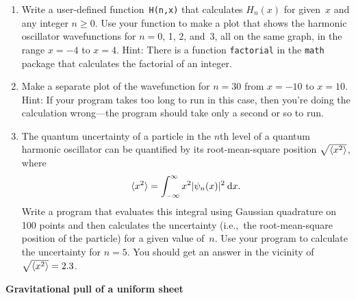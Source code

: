 \documentclass[12pt]{article}
\begin{document}
\begin{exercises}
\begin{enumerate}\setlength{\itemsep}{0pt}
\item Write a user-defined function~\verb|H(n,x)| that calculates $H_n(x)$
  for given~$x$ and any integer $n\ge0$.  Use your function to make a plot
  that shows the harmonic oscillator wavefunctions for $n=0$, 1, 2, and~3,
  all on the same graph, in the range $x=-4$ to $x=4$.  Hint: There is a
  function \verb|factorial| in the \verb|math| package that
  calculates the factorial of an integer.
\item Make a separate plot of the wavefunction for $n=30$ from $x=-10$ to
  $x=10$.  Hint: If your program takes too long to run in this case, then
  you're doing the calculation wrong---the program should take only a
  second or so to run.
\item The quantum uncertainty of a particle in the $n$th level of a quantum
  harmonic oscillator can be quantified by its root-mean-square position
  $\sqrt{\langle x^2\rangle}$, where
\begin{displaymath}
\langle x^2\rangle = \int_{-\infty}^\infty x^2 |\psi_n(x)|^2 \>\mathrm{d} x.
\end{displaymath}
Write a program that evaluates this integral using Gaussian quadrature on
100 points and then calculates the uncertainty (i.e.,~the root-mean-square
position of the particle) for a given value of~$n$.  Use your program to
calculate the uncertainty for $n=5$.  You should get an answer in the
vicinity of~$\sqrt{\langle x^2\rangle}=2.3$.
\end{enumerate}



\exercise \textbf{Gravitational pull of a uniform sheet}


\end{exercises}
\end{document}
